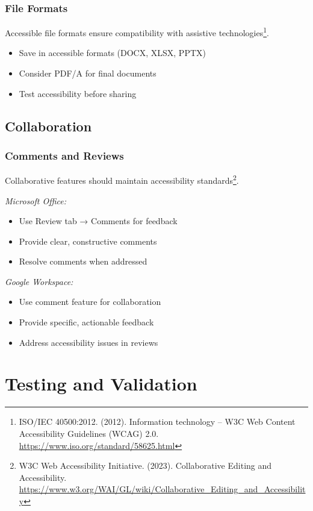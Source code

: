 \subsubsection{File Formats}
Accessible file formats ensure compatibility with assistive technologies\footnote{ISO/IEC 40500:2012. (2012). Information technology -- W3C Web Content Accessibility Guidelines (WCAG) 2.0. \url{https://www.iso.org/standard/58625.html}}.

\begin{itemize}
\item Save in accessible formats (DOCX, XLSX, PPTX)
\item Consider PDF/A for final documents
\item Test accessibility before sharing
\end{itemize}

\subsection{Collaboration}

\subsubsection{Comments and Reviews}
Collaborative features should maintain accessibility standards\footnote{W3C Web Accessibility Initiative. (2023). Collaborative Editing and Accessibility. \url{https://www.w3.org/WAI/GL/wiki/Collaborative_Editing_and_Accessibility}}.

\emph{Microsoft Office:}
\begin{itemize}
\item Use Review tab → Comments for feedback
\item Provide clear, constructive comments
\item Resolve comments when addressed
\end{itemize}

\emph{Google Workspace:}
\begin{itemize}
\item Use comment feature for collaboration
\item Provide specific, actionable feedback
\item Address accessibility issues in reviews
\end{itemize}

\section{Testing and Validation}
\label{sec:testing-validation}

